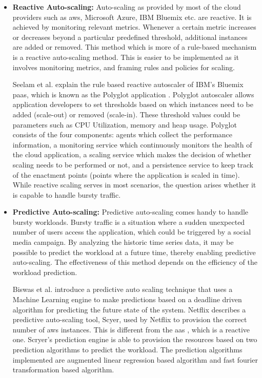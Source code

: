 \documentclass[article,type=msc,colorback,12pt,accentcolor=tud8b,table]{tudthesis}
\begin{document}
	\begin{itemize}
	
	\item{\textbf{Reactive Auto-scaling: }}Auto-scaling as provided by most of the cloud providers such as \gls{aws}, Microsoft Azure, IBM Bluemix etc. are reactive. It is achieved by monitoring relevant metrics. Whenever a certain metric increases or decreases beyond a particular predefined threshold, additional instances are added or removed. This method which is more of a rule-based mechanism is a reactive auto-scaling method. This is easier to be implemented as it involves monitoring metrics, and framing rules and policies for scaling. 
	
	Seelam et al. explain the rule based reactive autoscaler of IBM's Bluemix \gls{paas}, which is known as the Polyglot application \cite{seelam2015polyglot}. Polyglot autoscaler allows application developers to set thresholds based on which instances need to be added (scale-out) or removed (scale-in). These threshold values could be parameters such as CPU Utilization, memory and heap usage. Polyglot consists of the four components: agents which collect the performance information, a monitoring service which continuously monitors the health of the cloud application, a scaling service which makes the decision of whether scaling needs to be performed or not, and a persistence service to keep track of the enactment points (points where the application is scaled in time). While reactive scaling serves in most scenarios, the question arises whether it is capable to handle bursty traffic.

\item{\textbf{Predictive Auto-scaling: }}Predictive auto-scaling comes handy to handle bursty workloads. Bursty traffic is a situation where a sudden unexpected number of users access the application, which could be triggered by a social media campaign. By analyzing the historic time series data, it may be possible to predict the workload at a future time, thereby enabling predictive auto-scaling. The effectiveness of this method depends on the efficiency of the workload prediction.

Biswas et al. \cite{biswas2015predictive} introduce a predictive auto scaling technique that uses a Machine Learning engine to make predictions based on a deadline driven algorithm for predicting the future state of the system. Netflix\cite{Scryer1, Scryer2} describes a predictive auto-scaling tool, Scyer, used by Netflix to provision the correct number of \gls{aws} \cite{aws} instances. This is different from the \gls{aas} \cite{aas}, which is a reactive one. Scryer's prediction engine is able to provision the resources based on two prediction algorithms to predict the workload. The prediction algorithms implemented are augmented linear regression based algorithm and fast fourier transformation based algorithm.


\end{itemize}
\end{document}
